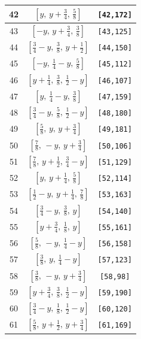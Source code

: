 \documentclass[fleqn,8pt]{jsarticle}
\begin{document}
\begin{longtable}{ccc}
42 & $\left[ y,\, y + \frac{3}{4},\, \frac{5}{8} \right]$ & {\tt [42,172]} \\ \hline
43 & $\left[ - y,\, y + \frac{3}{4},\, \frac{3}{8} \right]$ & {\tt [43,125]} \\ \hline
44 & $\left[ \frac{3}{4} - y,\, \frac{3}{8},\, y + \frac{1}{2} \right]$ & {\tt [44,150]} \\ \hline
45 & $\left[ - y,\, \frac{1}{4} - y,\, \frac{5}{8} \right]$ & {\tt [45,112]} \\ \hline
46 & $\left[ y + \frac{1}{4},\, \frac{3}{8},\, \frac{1}{2} - y \right]$ & {\tt [46,107]} \\ \hline
47 & $\left[ y,\, \frac{1}{4} - y,\, \frac{3}{8} \right]$ & {\tt [47,159]} \\ \hline
48 & $\left[ \frac{3}{4} - y,\, \frac{5}{8},\, \frac{1}{2} - y \right]$ & {\tt [48,180]} \\ \hline
49 & $\left[ \frac{5}{8},\, y,\, y + \frac{3}{4} \right]$ & {\tt [49,181]} \\ \hline
50 & $\left[ \frac{7}{8},\, - y,\, y + \frac{3}{4} \right]$ & {\tt [50,106]} \\ \hline
51 & $\left[ \frac{7}{8},\, y + \frac{1}{2},\, \frac{3}{4} - y \right]$ & {\tt [51,129]} \\ \hline
52 & $\left[ y,\, y + \frac{1}{4},\, \frac{5}{8} \right]$ & {\tt [52,114]} \\ \hline
53 & $\left[ \frac{1}{2} - y,\, y + \frac{1}{4},\, \frac{7}{8} \right]$ & {\tt [53,163]} \\ \hline
54 & $\left[ \frac{3}{4} - y,\, \frac{3}{8},\, y \right]$ & {\tt [54,140]} \\ \hline
55 & $\left[ y + \frac{3}{4},\, \frac{1}{8},\, y \right]$ & {\tt [55,161]} \\ \hline
56 & $\left[ \frac{5}{8},\, - y,\, \frac{1}{4} - y \right]$ & {\tt [56,158]} \\ \hline
57 & $\left[ \frac{3}{8},\, y,\, \frac{1}{4} - y \right]$ & {\tt [57,123]} \\ \hline
58 & $\left[ \frac{3}{8},\, - y,\, y + \frac{3}{4} \right]$ & {\tt [58,98]} \\ \hline
59 & $\left[ y + \frac{3}{4},\, \frac{3}{8},\, \frac{1}{2} - y \right]$ & {\tt [59,190]} \\ \hline
60 & $\left[ \frac{3}{4} - y,\, \frac{1}{8},\, \frac{1}{2} - y \right]$ & {\tt [60,120]} \\ \hline
61 & $\left[ \frac{5}{8},\, y + \frac{1}{2},\, y + \frac{3}{4} \right]$ & {\tt [61,169]} \\ \hline

\end{longtable}
\end{document}
